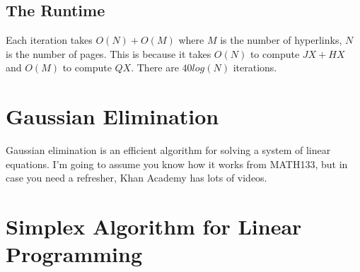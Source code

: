 \documentclass[12pt]{article}
\theoremstyle{definition}
\begin{document}
\subsection{The Runtime}
Each iteration takes $O(N) + O(M)$ where $M$ is the number of hyperlinks, $N$ is the number of pages. This is because it takes $O(N)$ to compute $JX + HX$ and $O(M)$ to compute $QX$. There are $40log(N)$ iterations. 


\section{Gaussian Elimination}
Gaussian elimination is an efficient algorithm for solving a system of linear equations. I'm going to assume you know how it works from MATH133, but in case you need a refresher, Khan Academy has lots of videos.
\\ \linebreak

\section{Simplex Algorithm for Linear Programming}
\end{document}
